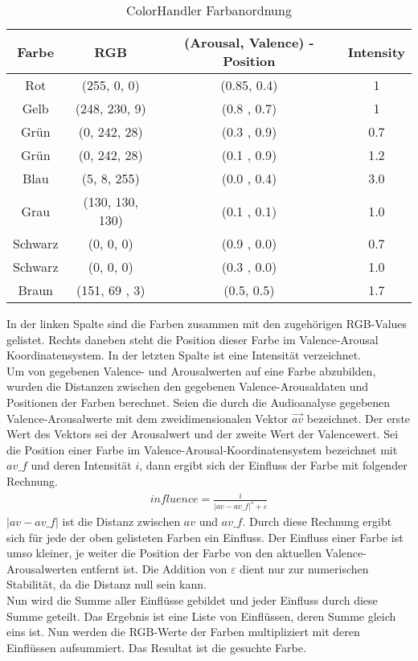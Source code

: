 \documentclass[11pt,a4paper]{article}
\begin{document}
\begin{table}[!ht]
\centering
\begin{tabular}{c | c | c | c}
	\textbf{Farbe} & \textbf{RGB} & (\textbf{Arousal}, \textbf{Valence}) -Position& \textbf{Intensity}\\
\hline
	Rot &	  (255, 0, 0) & (0.85, 0.4) & 1 \\ 
	Gelb &    (248, 230, 9) & (0.8 , 0.7) &  1 \\
	Grün &	  (0, 242, 28) & (0.3 , 0.9) &  0.7 \\
	Grün &	  (0, 242, 28) & (0.1 , 0.9) &  1.2 \\
	Blau &	  (5, 8, 255) & (0.0 , 0.4) &  3.0 \\
	Grau &	  (130, 130, 130) & (0.1 , 0.1) &  1.0 \\
	Schwarz & (0, 0, 0) & (0.9 , 0.0) &  0.7 \\
	Schwarz & (0, 0, 0) & (0.3 , 0.0) &  1.0 \\
	Braun &   (151, 69 , 3) & (0.5, 0.5) &  1.7 \\
\end{tabular}
\caption[ColorHandler Farbanordnung]{ColorHandler Farbanordnung}
\end{table}
\noindent
In der linken Spalte sind die Farben zusammen mit den zugehörigen RGB-Values gelistet. Rechts daneben steht die Position dieser Farbe im Valence-Arousal Koordinatensystem. In der letzten Spalte ist eine Intensität verzeichnet.\\
Um von gegebenen Valence- und Arousalwerten auf eine Farbe abzubilden, wurden die Distanzen zwischen den gegebenen Valence-Arousaldaten und Positionen der Farben berechnet. Seien die durch die Audioanalyse gegebenen Valence-Arousalwerte mit dem zweidimensionalen Vektor $\vec{av}$ bezeichnet. Der erste Wert des Vektors sei der Arousalwert und der zweite Wert der Valencewert. Sei die Position einer Farbe im Valence-Arousal-Koordinatensystem bezeichnet mit $av\_f$ und deren Intensität $i$, dann ergibt sich der Einfluss der Farbe mit folgender Rechnung.
\begin{align}
influence = \frac{i}{\vert av - av\_f\vert^5 + \varepsilon}
\end{align}
\noindent
$\vert av - av\_f\vert$ ist die Distanz zwischen $av$ und $av\_f$. Durch diese Rechnung ergibt sich für jede der oben gelisteten Farben ein Einfluss. Der Einfluss einer Farbe ist umso kleiner, je weiter die Position der Farbe von den aktuellen Valence-Arousalwerten entfernt ist. Die Addition von $\varepsilon$ dient nur zur numerischen Stabilität, da die Distanz null sein kann.\\
Nun wird die Summe aller Einflüsse gebildet und jeder Einfluss durch diese Summe geteilt. Das Ergebnis ist eine Liste von Einflüssen, deren Summe gleich eins ist. Nun werden die RGB-Werte der Farben multipliziert mit deren Einflüssen aufsummiert. Das Resultat ist die gesuchte Farbe.
\end{document}
